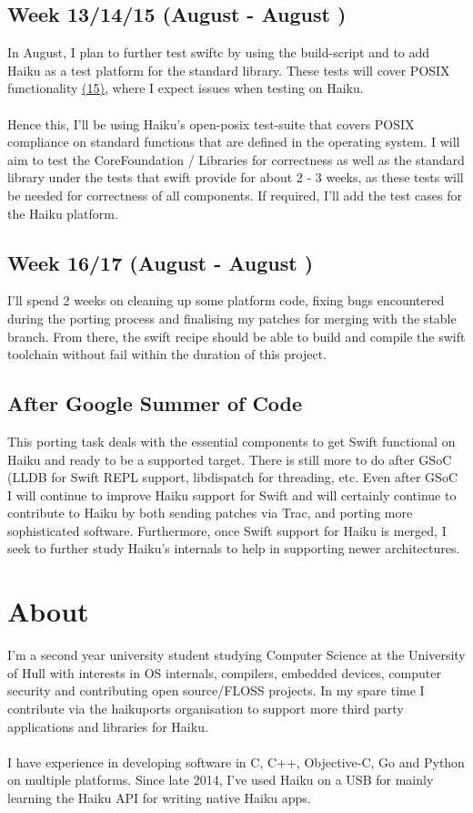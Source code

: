 \documentclass[12pt]{article}
\begin{document}
\subsection*{Week 13/14/15 (August  - August )}
In August, I plan to further test swiftc by using the build-script and to add Haiku as a test platform for the standard library. These tests will cover POSIX functionality \hyperlink{(15)}{(15)}, where I expect issues when testing on Haiku.\\
\\
Hence this, I'll be using Haiku's open-posix test-suite that covers POSIX compliance on standard functions that are defined in the operating system. I will aim to test the CoreFoundation / Libraries for correctness as well as the standard library under the tests that swift provide for about 2 - 3 weeks, as these tests will be needed for correctness of all components.  If required, I'll add the test cases for the Haiku platform. 
\subsection*{Week 16/17 (August  - August )}
I'll spend 2 weeks on cleaning up some platform code, fixing bugs encountered during the porting process and finalising my patches for merging with the stable branch. From there, the swift recipe should be able to build and compile the swift toolchain without fail within the duration of this project. 


\subsection*{After Google Summer of Code}
This porting task deals with the essential components to get Swift functional on Haiku and ready to be a supported target. There is still more to do after GSoC (LLDB for Swift REPL support, libdispatch for threading, etc. Even after GSoC I will continue to improve Haiku support for Swift and will certainly continue to contribute to Haiku by both sending patches via Trac, and porting more sophisticated software. Furthermore, once Swift support for Haiku is merged, I seek to further study Haiku's internals to help in supporting newer architectures.
    
\section*{About}
I'm a second year university student studying Computer Science at the University of Hull with interests in OS internals, compilers, embedded devices, computer security and contributing open source/FLOSS projects. In my spare time I contribute via the haikuports organisation to support more third party applications and libraries for Haiku.
\\\\
I have experience in developing software in C, C++, Objective-C, Go and Python on multiple platforms. Since late 2014, I've used Haiku on a USB for mainly learning the Haiku API for writing native Haiku apps.
\end{document}
